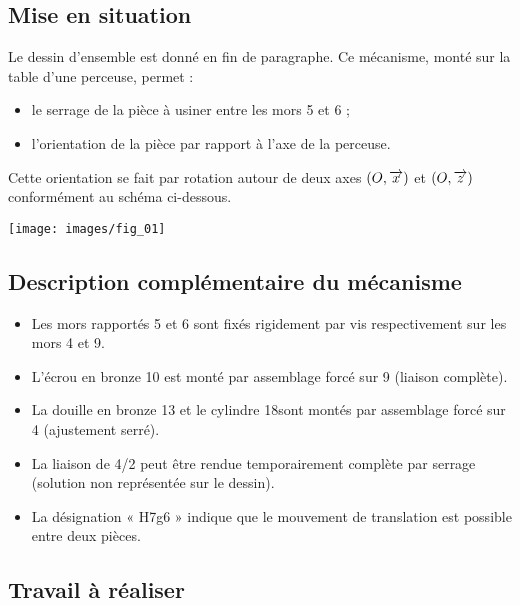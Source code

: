 \documentclass[10pt,fleqn]{article} %
\begin{document}

\vspace{10cm}
\pagestyle{fancy}
\thispagestyle{plain}


\def\columnseprulecolor{\color{ocre}}
\setlength{\columnseprule}{0.4pt} 
\begin{multicols}{2}
\subsection*{Mise en situation}

Le dessin d’ensemble est donné en fin de paragraphe.
Ce mécanisme, monté sur la table d’une perceuse, permet :
\begin{itemize}
\item le serrage de la pièce à usiner entre les mors 5 et 6 ;
\item l’orientation de la pièce par rapport à l’axe de la perceuse.
\end{itemize}
Cette orientation se fait par rotation autour de deux axes $\left(O,\overrightarrow{x}\right)$ et $\left(O,\overrightarrow{z}\right)$ conformément au schéma ci-dessous.

\begin{center}
\texttt{[image: images/fig\_01]}
\end{center}


\subsection*{Description complémentaire du mécanisme}
\begin{itemize}
\item Les mors rapportés 5 et 6 sont fixés rigidement par vis respectivement sur les mors 4 et 9.
\item L’écrou en bronze 10 est monté par assemblage forcé sur 9 (liaison complète).
\item La douille en bronze 13 et le cylindre 18sont montés par assemblage forcé sur 4 (ajustement serré).
\item La liaison de 4/2 peut être rendue temporairement complète par serrage (solution non représentée sur le
dessin).
\item La désignation « H7g6 » indique que le mouvement de translation est possible entre deux pièces. 
\end{itemize}

\subsection*{Travail à réaliser}


\end{multicols}
\end{document}
